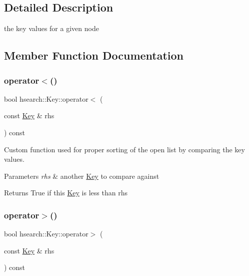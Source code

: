 \subsection{Detailed Description}
the key values for a given node 

\subsection{Member Function Documentation}
\mbox{\label{structhsearch_1_1Key_a869b0689bb15fdd6e5578f9d4fc466a6}} 
\subsubsection{\texorpdfstring{operator$<$()}{operator<()}}
{\footnotesize\ttfamily bool hsearch\+::\+Key\+::operator$<$ (\begin{DoxyParamCaption}\item[{const \hyperlink{structhsearch_1_1Key}{Key} \&}]{rhs }\end{DoxyParamCaption}) const}



Custom function used for proper sorting of the open list by comparing the key values. 


\begin{DoxyParams}{Parameters}
{\em rhs} & another \hyperlink{structhsearch_1_1Key}{Key} to compare against \\
\hline
\end{DoxyParams}
\begin{DoxyReturn}{Returns}
True if this \hyperlink{structhsearch_1_1Key}{Key} is less than rhs 
\end{DoxyReturn}
\mbox{\label{structhsearch_1_1Key_a14fb1a53446fb9be30c4d8d584406511}} 
\subsubsection{\texorpdfstring{operator$>$()}{operator>()}}
{\footnotesize\ttfamily bool hsearch\+::\+Key\+::operator$>$ (\begin{DoxyParamCaption}\item[{const \hyperlink{structhsearch_1_1Key}{Key} \&}]{rhs }\end{DoxyParamCaption}) const}



